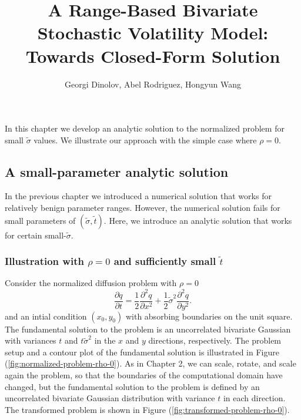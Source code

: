 \documentclass[10pt]{article}
\title{A Range-Based Bivariate Stochastic Volatility Model: Towards Closed-Form Solution}
\author{Georgi Dinolov, Abel Rodriguez, Hongyun Wang}
\date{} %
\begin{document}
\def\spacingset#1{\renewcommand{\baselinestretch}%
{#1}\small\normalsize} \spacingset{1}

\bigskip

\vspace{1cm}

In this chapter we develop an analytic solution to the normalized
problem for small $\tilde{\sigma}$ values. We illustrate our approach
with the simple case where $\rho=0$.

\subsection{A small-parameter analytic solution}
In the previous chapter we introduced a numerical solution that works
for relatively benign parameter ranges. However, the numerical
solution fails for small parameters of $(\tilde{\sigma},
\tilde{t})$. Here, we introduce an analytic solution that works for
certain small-$\tilde{\sigma}$.

\subsubsection{Illustration with $\rho=0$ and sufficiently small
  $\tilde{t}$}
Consider the normalized diffusion problem with $\rho=0$
\[
  \frac{\partial q}{\partial t} = \frac{1}{2}\frac{\partial^2 q}{\partial x^2} + \frac{1}{2}\tilde{\sigma}^2 \frac{\partial^2 q}{\partial y^2}.
\]
and an intial condition $(x_0, y_0)$ with absorbing boundaries on the
unit square. The fundamental solution to the problem is an
uncorrelated bivariate Gaussian with variances $t$ and
$t\tilde{\sigma}^2$ in the $x$ and $y$ directions, respectively. The
problem setup and a contour plot of the fundamental solution is
illustrated in Figure (\ref{fig:normalized-problem-rho-0}). As in
Chapter 2, we can scale, rotate, and scale again the problem, so that
the boundaries of the computational domain have changed, but the
fundamental solution to the problem is defined by an uncorrelated
bivariate Gaussian distribution with variance $t$ in each
direction. The transformed problem is shown in Figure
(\ref{fig:transformed-problem-rho-0}).
\end{document}
